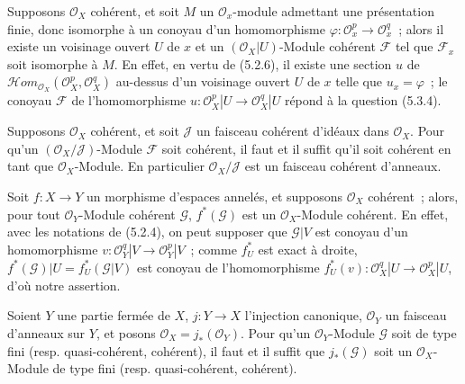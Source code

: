 \begin{env}[5.3.9]
\label{0.5.3.9-fr}
Supposons $\mathcal{O}_X$ cohérent, et soit $M$ un $\mathcal{O}_x$-module
admettant une présentation finie, donc isomorphe à un conoyau d'un
homomorphisme $\varphi:\mathcal{O}_x^p\to\mathcal{O}_x^q$~; alors il existe un
voisinage ouvert $U$ de $x$ et un $(\mathcal{O}_X|U)$-Module cohérent
$\mathcal{F}$ tel que $\mathcal{F}_x$ soit isomorphe à $M$. En effet, en vertu
de (5.2.6), il existe une section $u$ de
$\mathcal{H}\!om_{\mathcal{O}_X}(\mathcal{O}_X^p,\mathcal{O}_X^q)$ au-dessus
d'un voisinage ouvert $U$ de $x$ telle que $u_x=\varphi$~; le conoyau
$\mathcal{F}$ de l'homomorphisme
$u:\mathcal{O}_X^p|U\to\mathcal{O}_X^q|U$ répond à la question (5.3.4).
\end{env}

\begin{env}[5.3.10]
\label{0.5.3.10-fr}
Supposons $\mathcal{O}_X$ cohérent, et soit $\mathcal{J}$ un faisceau cohérent
d'idéaux dans $\mathcal{O}_X$. Pour qu'un
$(\mathcal{O}_X/\mathcal{J})$-Module $\mathcal{F}$ soit cohérent, il faut et il
suffit qu'il soit cohérent en tant que $\mathcal{O}_X$-Module. En particulier
$\mathcal{O}_X/\mathcal{J}$ est un faisceau cohérent d'anneaux.
\end{env}

\begin{env}[5.3.11]
\label{0.5.3.11-fr}
Soit $f:X\to Y$ un morphisme d'espaces annelés, et supposons
$\mathcal{O}_X$ cohérent~; alors, pour tout $\mathcal{O}_Y$-Module cohérent
$\mathcal{G}$, $f^*(\mathcal{G})$ est un $\mathcal{O}_X$-Module cohérent. En
effet, avec les notations de (5.2.4), on peut supposer que $\mathcal{G}|V$ est
conoyau d'un homomorphisme
$v:\mathcal{O}_Y^q|V\to\mathcal{O}_Y^p|V$~; comme $f_U^*$ est exact à droite,
$f^*(\mathcal{G})|U=f_U^*(\mathcal{G}|V)$ est conoyau de l'homomorphisme
$f_U^*(v):\mathcal{O}_X^q|U\to\mathcal{O}_X^p|U$, d'où notre assertion.
\end{env}

\begin{env}[5.3.12]
\label{0.5.3.12-fr}
Soient $Y$ une partie fermée de $X$, $j:Y\to X$ l'injection canonique,
$\mathcal{O}_Y$ un faisceau d'anneaux sur $Y$, et posons
$\mathcal{O}_X=j_*(\mathcal{O}_Y)$. Pour qu'un $\mathcal{O}_Y$-Module
$\mathcal{G}$ soit de type fini (resp. quasi-cohérent, cohérent), il faut et il
suffit que $j_*(\mathcal{G})$ soit un $\mathcal{O}_X$-Module de type fini
(resp. quasi-cohérent, cohérent).
\end{env}

